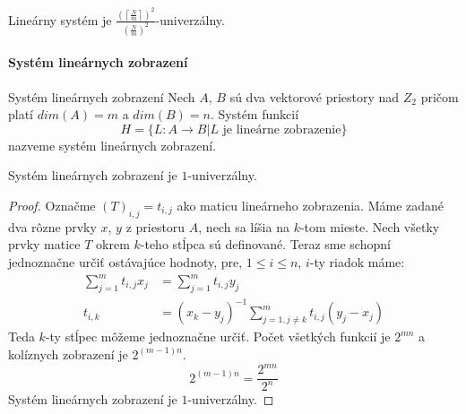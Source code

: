 \begin{remark}
Lineárny systém je $\frac{\left(\left\lceil \frac{N}{m} \right\rceil\right)^2}{\left(\frac{N}{m}\right)^2}$-univerzálny.
\end{remark}

\paragraph{Systém lineárnych zobrazení}
\begin{definition}{Systém lineárnych zobrazení}
Nech $A$, $B$ sú dva vektorové priestory nad $Z_2$ pričom platí $dim(A) = m$ a $dim(B) = n$. Systém funkcií 
\begin{displaymath}
H = \{L : A \rightarrow B | L \text{ je lineárne zobrazenie}\}
\end{displaymath}
nazveme systém lineárnych zobrazení.
\end{definition}
\begin{remark}
Systém lineárnych zobrazení je $1$-univerzálny.
\end{remark}
\begin{proof}
Označme $(T)_{i, j}=t_{i, j}$ ako maticu lineárneho zobrazenia. Máme zadané dva rôzne prvky $x$, $y$ z priestoru $A$, nech sa líšia na $k$-tom mieste. Nech všetky prvky matice $T$ okrem $k$-teho stĺpca sú definované. Teraz sme schopní jednoznačne určiť ostávajúce hodnoty, pre, $1 \leq i \leq n$, $i$-ty riadok máme:
\begin{displaymath}
\begin{split}
\displaystyle\sum_{j = 1}^{m}t_{i, j}x_j & = \displaystyle\sum_{j = 1}^{m}t_{i, j}y_j \\
t_{i, k} & = (x_k - y_j)^{-1}\displaystyle\sum_{j = 1, j \neq k}^{m}t_{i, j}(y_j - x_j)
\end{split}
\end{displaymath}
Teda $k$-ty stĺpec môžeme jednoznačne určiť. Počet všetkých funkcií je $2^{mn}$ a kolíznych zobrazení je $2^{(m-1)n}$.
\begin{displaymath}
2^{(m-1)n} = \frac{2^{mn}}{2^n}
\end{displaymath}
Systém lineárnych zobrazení je $1$-univerzálny.
\end{proof}

